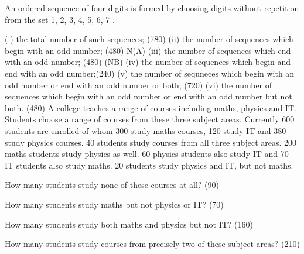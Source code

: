 An ordered sequence of four digits is formed by choosing digits without
repetition from the set {1, 2, 3, 4, 5, 6, 7} .

(i) the total number of such sequences; (780)
(ii) the number of sequences which begin with an odd number; (480) N(A)
(iii) the number of sequences which end with an odd number; (480) (NB)
(iv) the number of sequences which begin and end with an odd number;(240)
(v) the number of sequneces which begin with an odd number or end with an
odd number or both; (720)
(vi) the number of sequences which begin with an odd number or end with an
odd number but not both. (480)
A college teaches a range of courses including maths, physics and IT.
Students choose a range of courses from these three subject areas. Currently 600
students are enrolled of whom 300 study maths courses, 120 study IT
and 380 study physics courses. 40 students study courses from all three subject
areas. 200 maths students study physics as well. 60 physics students
also study IT and 70 IT students also study maths. 20 students study physics and IT, but not maths.

How many students study none of these courses at all? (90)

How many students study maths but not physics or IT? (70)

How many students study both maths and physics but not IT? (160)

How many students study courses from precisely two of these subject
areas? (210)
